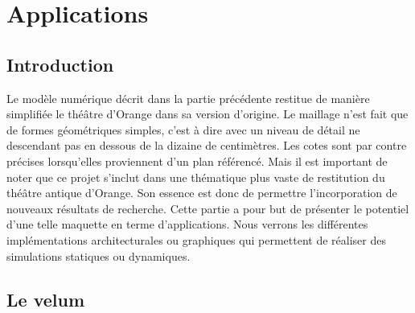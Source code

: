 		
		
		
		
		
		
		
		
		
		
		
\chapter{Applications}
	\minitoc
	\newpage

\section{Introduction}
Le modèle numérique décrit dans la partie précédente restitue de manière simplifiée le théâtre d'Orange dans sa version d'origine. Le maillage n'est fait que de formes géométriques simples, c'est à dire avec un niveau de détail ne descendant pas en dessous de la dizaine de centimètres. Les cotes sont par contre précises lorsqu'elles proviennent d'un plan référencé. Mais il est important de noter que ce projet s'inclut dans une thématique plus vaste de restitution du théâtre antique d'Orange. Son essence est donc de permettre l'incorporation de nouveaux résultats de recherche. Cette partie a pour but de présenter le potentiel d'une telle maquette en terme d'applications. Nous verrons les différentes implémentations architecturales ou graphiques qui permettent de réaliser des simulations statiques ou dynamiques.

\section{Le \gls{velum}} \label{sect_velum}

